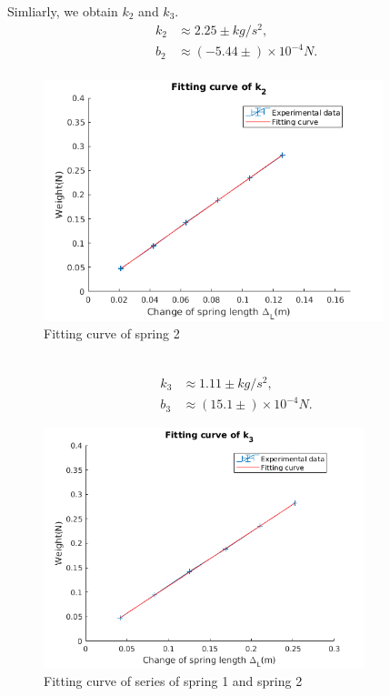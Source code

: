     Simliarly, we obtain $k_2$ and $k_3$.
    \[
    \begin{split}
        k_2&\approx 2.25\pm kg/s^2,\\
        b_2&\approx (-5.44\pm ) \times10^{-4}N.\\
    \end{split}
    \]
    \begin{figure}[h]
        \centering
        \label{k_2}
        \includegraphics[height=7cm]{images/k2.png}
        \caption{Fitting curve of spring 2}
    \end{figure}\\
    
    \[
    \begin{split}
        k_3&\approx 1.11\pm kg/s^2,\\
        b_3&\approx (15.1\pm ) \times10^{-4}N.        
    \end{split}
    \]
    \begin{figure}[h]
        \centering    
        \label{k_3}
        \includegraphics[height=7cm]{images/k3.png}
        \caption{Fitting curve of series of spring 1 and spring 2}
    \end{figure}
